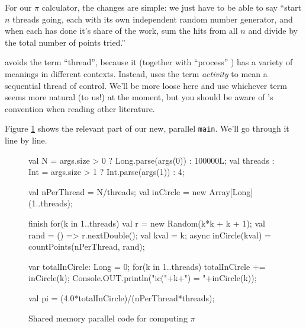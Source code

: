 For our $\pi$ calculator, the changes are simple: we just have to be able to
say ``start $n$ threads going, each with its own independent random number
generator, and when each has done it's share of the work, sum the hits from all
$n$ and divide by the total number of points tried.''  

\Xten{} avoids the term ``thread'', because it (together with ``process'' ) has
a variety of meanings in different contexts.  Instead, \Xten{} uses the term 
{\em activity} to mean a sequential thread of control. We'll be more loose here
and use whichever term seems more natural (to us!) at the moment, but you
should be aware of \Xten's convention when reading other literature.

Figure \ref{fig:mcpm} shows the relevant part of our new, parallel {\tt main}.
We'll go through it line by line.
\begin{figure}[!bthp]
\hrulefill
\begin{xtennum}[]
val N = args.size > 0 ? Long.parse(args(0)) : 100000L;  
val threads : Int = args.size > 1 ? Int.parse(args(1)) :  4; 

val nPerThread = N/threads; 
val inCircle = new Array[Long](1..threads);   

finish for(k in 1..threads) { 
   val r = new Random(k*k + k + 1);       
   val rand = () => r.nextDouble();       
   val kval = k;                     
   async inCircle(kval) = countPoints(nPerThread, rand); 
}                                 

var totalInCircle: Long = 0;             
for(k in 1..threads) {      
   totalInCircle += inCircle(k);         
   Console.OUT.println("ic("+k+") = "+inCircle(k)); 
}                                 

val pi = (4.0*totalInCircle)/(nPerThread*threads); 
\end{xtennum}
\hrulefill
\caption{Shared memory parallel code for computing $\pi$}\label{fig:mcpm}
\end{figure}
